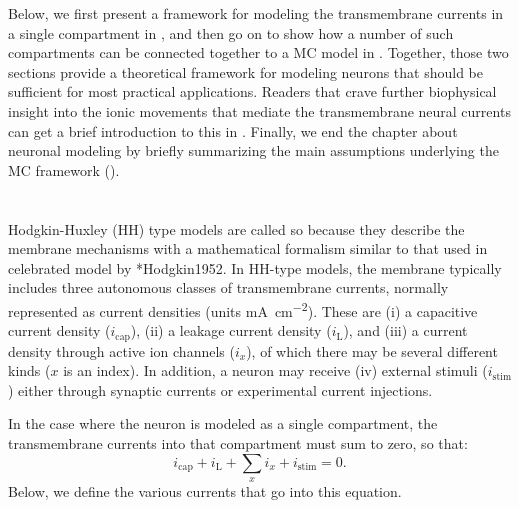 Below, we first present a framework for modeling the transmembrane currents in a single compartment in , and then go on to show how a number of such compartments can be connected together to a MC model in . Together, those two sections provide a theoretical framework for modeling neurons that should be sufficient for most practical applications. Readers that crave further biophysical insight into the ionic movements that mediate the transmembrane neural currents can get a brief introduction to this in . Finally, we end the chapter about neuronal modeling by briefly summarizing the main assumptions underlying the MC framework ().


\section{}
\label{sec:Neuron:membranecurrents}
Hodgkin-Huxley (HH) type models are called so because they describe the membrane mechanisms with a mathematical formalism similar to that used in celebrated model by \citeasnoun**{Hodgkin1952}. In HH-type models, the membrane typically includes three autonomous classes of transmembrane currents, normally represented as current densities (units \si{\milli\ampere\per\square\centi\metre}). These are (i) a capacitive current density ($i_{\mathrm{cap}}$), (ii) a leakage current density ($i_{\mathrm{L}}$), and (iii) a current density through active ion channels ($i_x$), of which there may be several different kinds ($x$ is an index). In addition, a neuron may receive (iv) external stimuli ($i_{\mathrm{stim}}$) either through synaptic currents or experimental current injections. 

In the case where the neuron is modeled as a single compartment, the transmembrane currents into that compartment must sum to zero, so that:
\begin{equation}
i_{\mathrm{cap}}+ i_{\mathrm{L}} + \sum_x{i_x} +  i_{\mathrm{stim}} = 0.
\label{eq:Neuron:singlecomp_zerosum}
\end{equation}
Below, we define the various currents that go into this equation.

